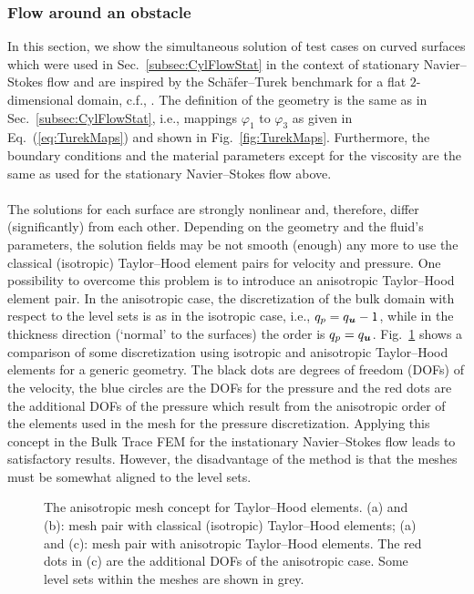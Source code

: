 \documentclass[12pt, twoside, english]{article}
\numberwithin{equation}{section}
\newcommand{\vek}[1]{\mathchoice{\displaystyle\boldsymbol#1}
{\textstyle\boldsymbol#1}{\scriptstyle\boldsymbol#1}
{\scriptscriptstyle\boldsymbol#1}}
\begin{document}
\subsubsection{Flow around an obstacle}
In this section, we show the simultaneous solution of test cases on curved surfaces which were used in Sec.~\ref{subsec:CylFlowStat} in the context of stationary Navier--Stokes flow and are inspired by the Schäfer--Turek benchmark for a flat $2$-dimensional domain, c.f., \cite{Schaefer_1996a}. The definition of the geometry is the same as in Sec.~\ref{subsec:CylFlowStat}, i.e., mappings $\varphi_1$ to $\varphi_3$ as given in Eq.~(\ref{eq:TurekMaps}) and shown in Fig.~\ref{fig:TurekMaps}. Furthermore, the boundary conditions and the material parameters except for the viscosity are the same as used for the stationary Navier--Stokes flow above.\\
\\
The solutions for each surface are strongly nonlinear and, therefore, differ (significantly) from each other. Depending on the geometry and the fluid's parameters, the solution fields may be not smooth (enough) any more to use the classical (isotropic) Taylor--Hood element pairs for velocity and pressure. One possibility to overcome this problem is to introduce an anisotropic Taylor--Hood element pair. In the anisotropic case, the discretization of the bulk domain with respect to the level sets is as in the isotropic case, i.e., $q_p = q_{\vek{u}}-1$, while in the thickness direction (`normal' to the surfaces) the order is $q_p = q_{\vek{u}}$. Fig.~\ref{fig:AnisMeshGenEx} shows a comparison of some discretization using isotropic and anisotropic Taylor--Hood elements for a generic geometry. The black dots are degrees of freedom (DOFs) of the velocity, the blue circles are the DOFs for the pressure and the red dots are the additional DOFs of the pressure which result from the anisotropic order of the elements used in the mesh for the pressure discretization. Applying this concept in the Bulk Trace FEM for the instationary Navier--Stokes flow leads to satisfactory results. However, the disadvantage of the method is that the meshes must be somewhat aligned to the level sets.
\begin{figure}
	\centering
	
	\hspace{1cm}
	\hspace{1cm}
	
	\caption{\label{fig:AnisMeshGenEx} The anisotropic mesh concept for Taylor--Hood elements. (a) and (b): mesh pair with classical (isotropic) Taylor--Hood elements; (a) and (c): mesh pair with anisotropic Taylor--Hood elements. The red dots in (c) are the additional DOFs of the anisotropic case. Some level sets within the meshes are shown in grey.}
\end{figure}
\end{document}
